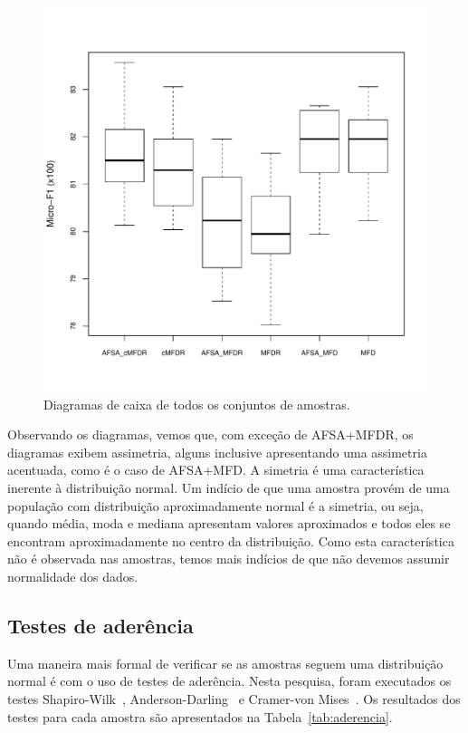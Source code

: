 \documentclass[conference]{IEEEtran}
\begin{document}
\begin{figure}[h]
	\centering
	\includegraphics[width=\linewidth]{img/blueboxplot.pdf}
	\caption{Diagramas de caixa de todos os conjuntos de amostras.}
	\label{fig:boxplot}
\end{figure}

Observando os diagramas, vemos que, com exceção de AFSA+MFDR, os diagramas exibem assimetria, alguns inclusive apresentando uma assimetria acentuada, como é o caso de AFSA+MFD.
A simetria é uma característica inerente à distribuição normal. Um indício de que uma amostra provém de uma população com distribuição aproximadamente normal é a simetria, ou seja, quando média, moda e mediana apresentam valores aproximados e todos eles se encontram aproximadamente no centro da distribuição.
Como esta característica não é observada nas amostras, temos mais indícios de que não devemos assumir normalidade dos dados.


\subsection{Testes de aderência}

Uma maneira mais formal de verificar se as amostras seguem uma distribuição normal é com o uso de testes de aderência.
Nesta pesquisa, foram executados os testes Shapiro-Wilk~\cite{shapiro1965analysis}, Anderson-Darling~\cite{anderson1954test} e Cramer-von Mises~\cite{durbin1972components}.
Os resultados dos testes para cada amostra são apresentados na Tabela~\ref{tab:aderencia}.
\end{document}
